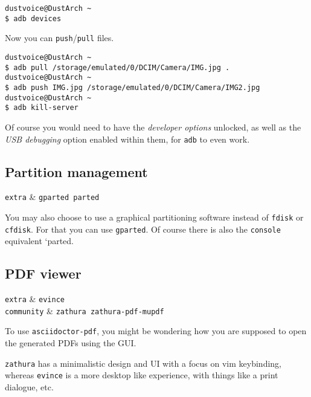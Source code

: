\documentclass[10pt]{dustdoc}
\begin{document}
\begin{verbatim}
dustvoice@DustArch ~
$ adb devices
\end{verbatim}

Now you can \texttt{push}/\texttt{pull} files.

\begin{verbatim}
dustvoice@DustArch ~
$ adb pull /storage/emulated/0/DCIM/Camera/IMG.jpg .
dustvoice@DustArch ~
$ adb push IMG.jpg /storage/emulated/0/DCIM/Camera/IMG2.jpg
dustvoice@DustArch ~
$ adb kill-server
\end{verbatim}

\begin{NOTE}
    Of course you would need to have the \emph{developer options} unlocked, as well as the \emph{USB debugging} option enabled within them, for \texttt{adb} to even work.
\end{NOTE}

\subsection{Partition management}
\label{sec:partition-management}

\begin{packagetable}
    \texttt{extra} & \texttt{gparted parted} \\
\end{packagetable}

You may also choose to use a graphical partitioning software instead of \texttt{fdisk} or \texttt{cfdisk}.
For that you can use \texttt{gparted}.
Of course there is also the \texttt{console} equivalent `parted.

\subsection{PDF viewer}
\label{sec:gui-pdf-viewer}

\begin{packagetable}
    \texttt{extra} & \texttt{evince} \\
    \texttt{community} & \texttt{zathura zathura-pdf-mupdf} \\
\end{packagetable}

To use \texttt{asciidoctor-pdf}, you might be wondering how you are supposed to open the generated PDFs using the GUI.

\texttt{zathura} has a minimalistic design and UI with a focus on vim keybinding, whereas \texttt{evince} is a more desktop like experience, with things like a print dialogue, etc.
\end{document}
